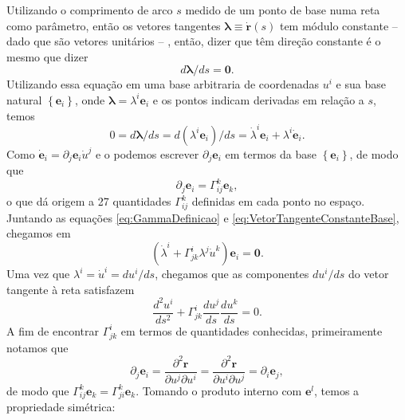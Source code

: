 Utilizando o comprimento de arco $ s $ medido de um ponto de base numa reta como parâmetro, então os vetores tangentes $ \boldsymbol{\lambda} \equiv \dot{\mathbf{r}}(s) $ tem módulo constante
 -- dado que são vetores unitários --%
, então, dizer que têm direção constante é o mesmo que dizer
\begin{equation}\label{eq:VetorTangenteConstante}
d \boldsymbol{\lambda} / d s=\mathbf{0} .
\end{equation}
Utilizando essa equação em uma base arbitraria de coordenadas $ u^i $ e sua base natural $ \left\{\mathbf{e}_{i}\right\} $, onde $ \boldsymbol{\lambda}=\lambda^{i} \mathbf{e}_{i} $ e os pontos indicam derivadas em relação a $ s $, temos
\begin{equation}\label{eq:VetorTangenteConstanteBase}
0=d \boldsymbol{\lambda} / d s=d\left(\lambda^{i} \mathbf{e}_{i}\right) / d s=\dot{\lambda}^{i} \mathbf{e}_{i}+\lambda^{i} \dot{\mathbf{e}}_{i} .
\end{equation}
Como $ \dot{\mathbf{e}}_{i}=\partial_{j} \mathbf{e}_{i} \dot{u}^{j} $ e o podemos escrever $ \partial_{j} \mathbf{e}_{i}  $ em termos da base $ \left\{\mathbf{e}_{i}\right\} $, de modo que
\begin{equation}\label{eq:GammaDefinicao}
\partial_{j} \mathbf{e}_{i}=\Gamma_{i j}^{k} \mathbf{e}_{k} ,
\end{equation}
o que dá origem a 27 quantidades $ \Gamma_{i j}^{k} $ definidas em cada ponto no espaço. Juntando as equações \eqref{eq:GammaDefinicao} e \eqref{eq:VetorTangenteConstanteBase}, chegamos em
\begin{equation}\label{eq:CoordenadasLambdaE}
	\left(\dot{\lambda}^{i}+\Gamma_{j k}^{i} \lambda^{j} \dot{u}^{k}\right) \mathbf{e}_{i}=\mathbf{0} .
\end{equation}
Uma vez que $ \lambda^{i}=\dot{u}^{i}=d u^{i} / d s $, chegamos que as componentes $ d u^{i} / d s $ do vetor tangente à reta satisfazem
\begin{equation}\label{eq:ComponentesUGamma}
\frac{d^{2} u^{i}}{d s^{2}}+\Gamma_{j k}^{i} \frac{d u^{j}}{d s} \frac{d u^{k}}{d s}=0 .
\end{equation} 
A fim de encontrar $ \Gamma_{j k}^{i} $ em termos de quantidades conhecidas, primeiramente notamos que
\[
\partial_{j} \mathbf{e}_{i}=\frac{\partial^{2} \mathbf{r}}{\partial u^{j} \partial u^{i}}=\frac{\partial^{2} \mathbf{r}}{\partial u^{i} \partial u^{j}}=\partial_{i} \mathbf{e}_{j} ,
\]
de modo que $ \Gamma_{i j}^{k} \mathbf{e}_{k}=\Gamma_{j i}^{k} \mathbf{e}_{k} $. Tomando o produto interno com $ \mathbf{e}^{l} $, temos a propriedade simétrica:
